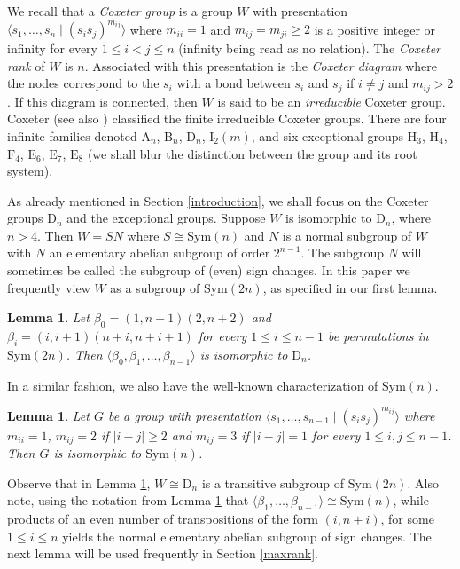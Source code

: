 \documentclass{amsart}
\numberwithin{equation}{section}
\theoremstyle{plain} %
\newtheorem{lemma}[theorem]{Lemma}
\begin{document}
We recall that a \emph{Coxeter group} is a group $W$ with presentation $\langle s_1, \dots, s_n \mid (s_i s_j)^{m_{ij}} \rangle$ where $m_{ii}=1$ and $m_{ij}=m_{ji} \ge 2$ is a positive integer or infinity for every $1 \leq i < j \leq n$ (infinity being read as no relation).  The \emph{Coxeter rank} of $W$ is $n$.  Associated with this presentation is the \emph{Coxeter diagram} where the nodes correspond to the $s_i$ with a bond between $s_i$ and $s_j$ if $i \not= j$ and $m_{ij} > 2$. If this diagram is connected, then $W$ is said to be an \emph{irreducible} Coxeter group. Coxeter \cite{Coxeter} (see also \cite{coxbible}) classified the finite irreducible Coxeter groups. There are four infinite families denoted $\mathrm{A}_n$, $\mathrm{B}_n$, $\mathrm{D}_n$, $\mathrm{I}_2(m)$, and six exceptional groups $\mathrm{H}_3$, $\mathrm{H}_4$, $\mathrm{F}_4$, $\mathrm{E}_6$, $\mathrm{E}_7$, $\mathrm{E}_8$ (we shall blur the distinction between the group and its root system).

As already mentioned in Section \ref{introduction}, we shall focus on the Coxeter groups $\mathrm{D}_n$ and the exceptional groups. Suppose $W$ is isomorphic to $\mathrm{D}_n$, where $n > 4$. Then $W = SN$ where $S \cong \mathrm{Sym}(n)$ and $N$ is a normal subgroup of $W$ with $N$ an elementary abelian subgroup of order $2^{n-1}$. The subgroup $N$ will sometimes be called the subgroup of (even) sign changes. In this paper we frequently view $W$ as a subgroup of $\mathrm{Sym}(2n)$, as specified in our first lemma.

\begin{lemma}{\cite[(2.10)]{coxbible}} \label{bndn}
Let $\beta_0=(1,n+1)(2,n+2)$ and $\beta_i=(i,i+1)(n+i,n+i+1)$ for every $1 \leq i \leq n-1$  be permutations in $\mathrm{Sym}(2n)$. Then $\langle \beta_0,\beta_1,\dots,\beta_{n-1} \rangle$ is isomorphic to $\mathrm{D}_n$.
\end{lemma}

In a similar fashion, we also have the well-known characterization of $\mathrm{Sym}(n)$.

\begin{lemma}{\cite[(6.4)]{coxbible}} \label{sn}
Let $G$ be a group with presentation $\langle s_1, \dots, s_{n-1} \mid (s_i s_j)^{m_{ij}} \rangle$ where $m_{ii} = 1$, $m_{ij}=2$ if $|i-j| \ge 2$ and $m_{ij}=3$ if $|i-j|=1$ for every $1 \leq i,j \leq n-1$. Then $G$ is isomorphic to $\mathrm{Sym}(n)$.
\end{lemma}

Observe that in Lemma \ref{bndn}, $W \cong \mathrm{D}_n$ is a transitive subgroup of $\mathrm{Sym}(2n)$. Also note, using the notation from Lemma \ref{bndn} that  $\langle \beta_1,\dots,\beta_{n-1} \rangle \cong \mathrm{Sym}(n)$, while products of an even number of transpositions of the form $(i, n+i)$, for some $1 \leq i \leq n$ yields the normal elementary abelian subgroup of sign changes. The next lemma will be used frequently in Section \ref{maxrank}.
\end{document}
